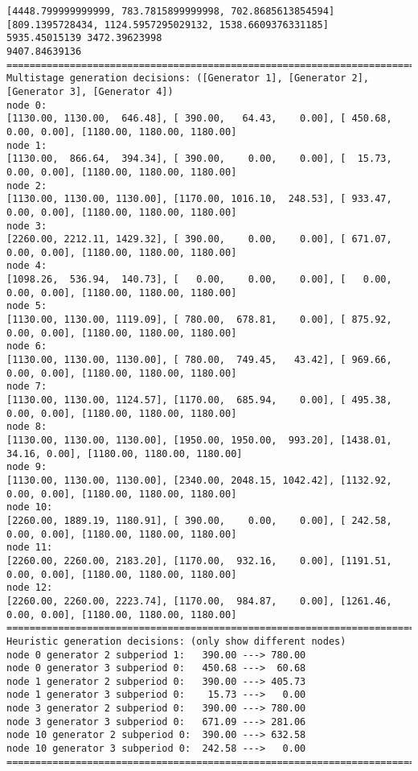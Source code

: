 \documentclass[10pt]{article}
\theoremstyle{plain}
\theoremstyle{definition}
\theoremstyle{remark}
\begin{document}
{\begin{verbatim}
[4448.799999999999, 783.7815899999998, 702.8685613854594]
[809.1395728434, 1124.5957295029132, 1538.6609376331185]
5935.45015139 3472.39623998
9407.84639136
========================================================================
Multistage generation decisions: ([Generator 1], [Generator 2], [Generator 3], [Generator 4])
node 0: 
[1130.00, 1130.00,  646.48], [ 390.00,   64.43,    0.00], [ 450.68,  0.00, 0.00], [1180.00, 1180.00, 1180.00]
node 1:
[1130.00,  866.64,  394.34], [ 390.00,    0.00,    0.00], [  15.73,  0.00, 0.00], [1180.00, 1180.00, 1180.00]
node 2:
[1130.00, 1130.00, 1130.00], [1170.00, 1016.10,  248.53], [ 933.47,  0.00, 0.00], [1180.00, 1180.00, 1180.00]
node 3:
[2260.00, 2212.11, 1429.32], [ 390.00,    0.00,    0.00], [ 671.07,  0.00, 0.00], [1180.00, 1180.00, 1180.00]
node 4:
[1098.26,  536.94,  140.73], [   0.00,    0.00,    0.00], [   0.00,  0.00, 0.00], [1180.00, 1180.00, 1180.00]
node 5:
[1130.00, 1130.00, 1119.09], [ 780.00,  678.81,    0.00], [ 875.92,  0.00, 0.00], [1180.00, 1180.00, 1180.00]
node 6:
[1130.00, 1130.00, 1130.00], [ 780.00,  749.45,   43.42], [ 969.66,  0.00, 0.00], [1180.00, 1180.00, 1180.00]
node 7:
[1130.00, 1130.00, 1124.57], [1170.00,  685.94,    0.00], [ 495.38,  0.00, 0.00], [1180.00, 1180.00, 1180.00]
node 8:
[1130.00, 1130.00, 1130.00], [1950.00, 1950.00,  993.20], [1438.01, 34.16, 0.00], [1180.00, 1180.00, 1180.00]
node 9:
[1130.00, 1130.00, 1130.00], [2340.00, 2048.15, 1042.42], [1132.92,  0.00, 0.00], [1180.00, 1180.00, 1180.00]
node 10:
[2260.00, 1889.19, 1180.91], [ 390.00,    0.00,    0.00], [ 242.58,  0.00, 0.00], [1180.00, 1180.00, 1180.00]
node 11:
[2260.00, 2260.00, 2183.20], [1170.00,  932.16,    0.00], [1191.51,  0.00, 0.00], [1180.00, 1180.00, 1180.00]
node 12:
[2260.00, 2260.00, 2223.74], [1170.00,  984.87,    0.00], [1261.46,  0.00, 0.00], [1180.00, 1180.00, 1180.00]
========================================================================
Heuristic generation decisions: (only show different nodes)
node 0 generator 2 subperiod 1:   390.00 ---> 780.00
node 0 generator 3 subperiod 0:   450.68 --->  60.68
node 1 generator 2 subperiod 0:   390.00 ---> 405.73
node 1 generator 3 subperiod 0:    15.73 --->   0.00 
node 3 generator 2 subperiod 0:   390.00 ---> 780.00
node 3 generator 3 subperiod 0:   671.09 ---> 281.06
node 10 generator 2 subperiod 0:  390.00 ---> 632.58
node 10 generator 3 subperiod 0:  242.58 --->   0.00
========================================================================
\end{verbatim}
}
\end{document}
